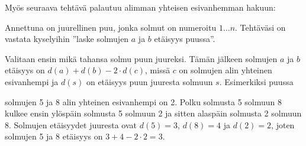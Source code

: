 Myös seuraava tehtävä palautuu alimman yhteisen
esivanhemman hakuun:
\begin{task}
Annettuna on juurellinen puu, jonka solmut on numeroitu $1 \ldots n$.
Tehtäväsi on vastata kyselyihin
''laske solmujen $a$ ja $b$ etäisyys puussa''.
\end{task}

Valitaan ensin mikä tahansa
solmu puun juureksi.
Tämän jälkeen solmujen $a$ ja $b$
etäisyys on $d(a)+d(b)-2 \cdot d(c)$,
missä $c$ on solmujen alin yhteinen esivanhempi
ja $d(s)$ on etäisyys puun juuresta solmuun $s$.
Esimerkiksi puussa

\begin{center}
\end{center}

solmujen 5 ja 8 alin yhteinen esivanhempi on 2.
Polku solmusta 5 solmuun 8
kulkee ensin ylöspäin solmusta 5
solmuun 2 ja sitten alaspäin
solmusta 2 solmuun 8.
Solmujen etäisyydet juuresta ovat $d(5)=3$,
$d(8)=4$ ja $d(2)=2$,
joten solmujen 5 ja 8 etäisyys
on $3+4-2\cdot2=3$.


